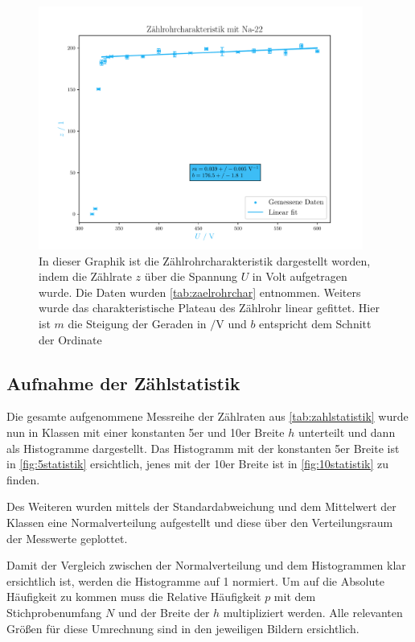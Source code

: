 \documentclass[12pt,english,ngerman]{scrartcl}
\begin{document}
\begin{figure}[H]
	\begin{center}
		\includegraphics[width = 0.95\textwidth]{figures/charakteristik.pdf}
	\end{center}
	\caption[Aufnahme der Zählrohrcharakteristik bei  Probe mit linearem
		Fit]{
		In dieser Graphik ist die Zählrohrcharakteristik dargestellt worden,
		indem die Zählrate $z$ über die Spannung $U$ in Volt aufgetragen wurde. Die
		Daten wurden \autoref{tab:zaelrohrchar} entnommen. Weiters wurde das
		charakteristische Plateau des Zählrohr linear gefittet. Hier ist $m$ die
		Steigung der Geraden in $\si{\per\volt}$ und $b$ entspricht dem Schnitt der
		Ordinate
	}\label{fig:zaelrohrchar}
\end{figure}

\subsection{Aufnahme der Zählstatistik}

Die gesamte aufgenommene Messreihe der Zählraten aus
\autoref{tab:zahlstatistik} wurde nun in Klassen mit einer konstanten 5er und
10er Breite $h$ unterteilt und dann als Histogramme dargestellt. Das Histogramm
mit der konstanten 5er Breite ist in \autoref{fig:5statistik} ersichtlich,
jenes mit der 10er Breite ist in \autoref{fig:10statistik} zu finden.

Des Weiteren wurden mittels der Standardabweichung und dem Mittelwert der
Klassen eine Normalverteilung aufgestellt und diese über den Verteilungsraum
der Messwerte geplottet.

Damit der Vergleich zwischen der Normalverteilung und dem Histogrammen klar
ersichtlich ist, werden die Histogramme auf 1 normiert. Um auf die Absolute
Häufigkeit zu kommen muss die Relative Häufigkeit $p$ mit dem Stichprobenumfang
$N$ und der Breite der $h$ multipliziert werden. Alle relevanten Größen für
diese Umrechnung sind in den jeweiligen Bildern ersichtlich.
\end{document}
